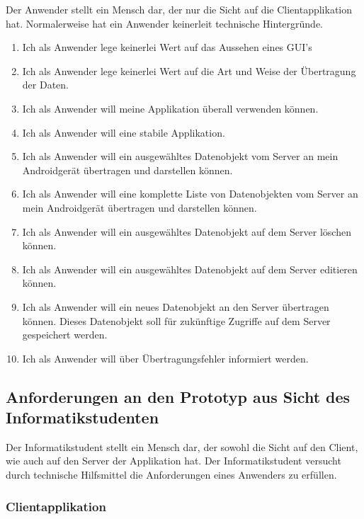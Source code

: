 \documentclass[listof=totocnumbered, bibliography=totocnumbered]{scrreprt}
\begin{document}
  Der Anwender stellt ein Mensch dar, der nur die Sicht auf die
  Clientapplikation hat. Normalerweise hat ein Anwender keinerleit technische
  Hintergründe.
  
  
  \begin{enumerate}
    \item Ich als Anwender lege keinerlei Wert auf das Aussehen eines
    \ac{GUI}'s
    \item Ich als Anwender lege keinerlei Wert auf die Art und Weise der
    Übertragung der Daten.
    \item Ich als Anwender will meine Applikation überall verwenden können.
    \item Ich als Anwender will eine stabile Applikation.
    \item Ich als Anwender will ein ausgewähltes Datenobjekt vom Server an mein
    Androidgerät übertragen und darstellen können.
    \item Ich als Anwender will eine komplette Liste von Datenobjekten vom
    Server an mein Androidgerät übertragen und darstellen können.
    \item Ich als Anwender will ein ausgewähltes Datenobjekt auf dem Server
    löschen können.
    \item Ich als Anwender will ein ausgewähltes Datenobjekt auf dem Server
    editieren können.
    \item Ich als Anwender will ein neues Datenobjekt an den Server übertragen
    können. Dieses Datenobjekt soll für zukünftige Zugriffe auf dem Server
    gespeichert werden.
    \item Ich als Anwender will über Übertragungsfehler informiert werden.
    \setcounter{userStoriesZaehler}{\value{enumi}}
  \end{enumerate}
  
  \subsection{Anforderungen an den Prototyp aus Sicht des Informatikstudenten}
  
  Der Informatikstudent stellt ein Mensch dar, der sowohl die Sicht auf den
  Client, wie auch auf den Server der Applikation hat. Der Informatikstudent
  versucht durch technische Hilfsmittel die Anforderungen eines Anwenders zu
  erfüllen.
  
  \subsubsection{Clientapplikation}
  
\end{document}
